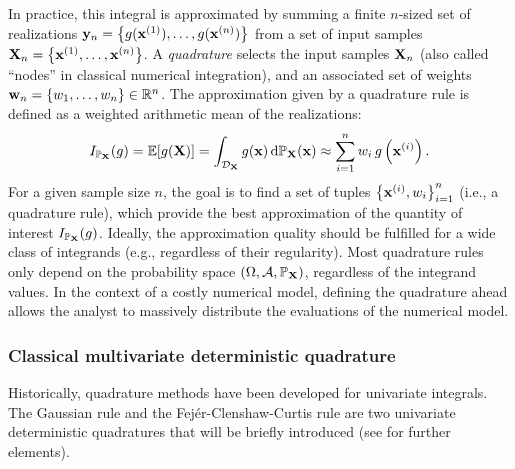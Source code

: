 In practice, this integral is approximated by summing a finite $n$-sized set of realizations ${\bf y}_n = \left\{g({\bf x}^{(1)}), \dots, g({\bf x}^{(n)})\right\}$ from a set of input samples ${\bf X}_n = \left\{{\bf x}^{(1)}, \dots, {\bf x}^{(n)}\right\}$. 
A \textit{quadrature} selects the input samples ${\bf X}_n$ (also called ``nodes'' in classical numerical integration), and an associated set of weights ${\bf w}_n = \{w_1, \dots, w_n\} \in \mathbb{R}^n$. 
The approximation given by a quadrature rule is defined as a weighted arithmetic mean of the realizations:
\begin{equation}
    I_{\mathbb{P}_{{\bf X}}}(g) = \mathbb{E}[g({\bf X})] = \int_{\mathcal{D}_{\bf X}} g({\bf x}) \, \mathrm{d}\mathbb{P}_{{\bf X}}({\bf x}) \approx \sum_{i=1}^n w_i \, g\left({\bf x}^{(i)}\right).
\end{equation}
For a given sample size $n$, the goal is to find a set of tuples $\left\{{\bf x}^{(i)}, w_i \right\}_{i=1}^n$ (i.e., a quadrature rule), which provide the best approximation of the quantity of interest $I_{\mathbb{P}_{{\bf X}}}(g)$. 
Ideally, the approximation quality should be fulfilled for a wide class of integrands (e.g., regardless of their regularity). 
Most quadrature rules only depend on the probability space $(\Omega, \mathcal{A}, \mathbb{P}_{{\bf X}})$, regardless of the integrand values. 
In the context of a costly numerical model, defining the quadrature ahead allows the analyst to massively distribute the evaluations of the numerical model. 



\subsubsection{Classical multivariate deterministic quadrature}

Historically, quadrature methods have been developed for univariate integrals. 
The Gaussian rule and the Fej\'{e}r-Clenshaw-Curtis rule are two univariate deterministic quadratures that will be briefly introduced (see \citealp{sullivan_2015} for further elements). 

